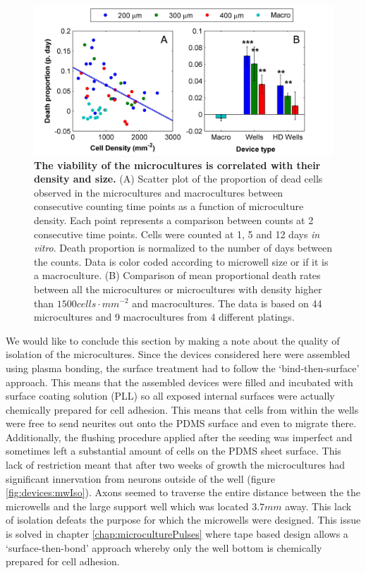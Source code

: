         \begin{figure}[h]
            \centering
            \includegraphics[width=15cm]{chapter4/figures/microWellsStats/mwStats.jpg}
            \caption[Statistics of microculture viability over development]{\textbf{The viability of the microcultures is correlated with their density and size.} (A) Scatter plot of the proportion of dead cells observed in the microcultures and macrocultures between consecutive counting time points as a function of microculture density. Each point represents a comparison between counts at 2 consecutive time points. Cells were counted at 1, 5 and 12 days \textit{in vitro}. Death proportion is normalized to the number of days between the counts. Data is color coded according to microwell size or if it is a macroculture. (B) Comparison of mean proportional death rates between all the microcultures or microcultures with density higher than \(1500 cells\cdot mm^{-2}\) and macrocultures. The data is based on 44 microcultures and 9 macrocultures from 4 different platings.}
            \label{fig:devices:mwStats}
        \end{figure}

        We would like to conclude this section by making a note about the quality of isolation of the microcultures. Since the devices considered here were assembled using plasma bonding, the surface treatment had to follow the `bind-then-surface' approach. This means that the assembled devices were filled and incubated with surface coating solution (PLL) so all exposed internal surfaces were actually chemically prepared for cell adhesion. This means that cells from within the wells were free to send neurites out onto the PDMS surface and even to migrate there. Additionally, the flushing procedure applied after the seeding was imperfect and sometimes left a substantial amount of cells on the PDMS sheet surface. This lack of restriction meant that after two weeks of growth the microcultures had significant innervation from neurons outside of the well (figure \ref{fig:devices:mwIso}). Axons seemed to traverse the entire distance between the the microwells and the large support well which was located \(3.7 mm\) away. This lack of isolation defeats the purpose for which the microwells were designed. This issue is solved in chapter \ref{chap:microculturePulses} where tape based design allows a `surface-then-bond' approach whereby only the well bottom is chemically prepared for cell adhesion.


